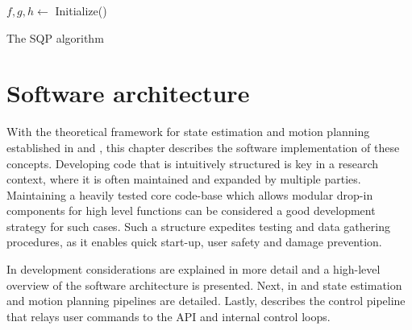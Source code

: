 \documentclass[times, utf8, diplomski, english]{fer}
\begin{document}
\begin{algorithm}[h]
 $f,g,h \leftarrow$ Initialize()
 \caption{The SQP algorithm}
 \label{algorithm:sqp}
\end{algorithm}










\chapter{Software architecture}
With the theoretical framework for state estimation and motion planning established in  and , this chapter describes the software implementation of these concepts.
Developing code that is intuitively structured is key in a research context, where it is often maintained and expanded by multiple parties.
Maintaining a heavily tested core code-base which allows modular drop-in components for high level functions can be considered a good development strategy for such cases.
Such a structure expedites testing and data gathering procedures, as it enables quick start-up, user safety and damage prevention.

In  development considerations are explained in more detail and a high-level overview of the software architecture is presented.
Next, in  and  state estimation and motion planning pipelines are detailed.%
Lastly,  describes the control pipeline that relays user commands to the API and internal control loops. %
\end{document}
